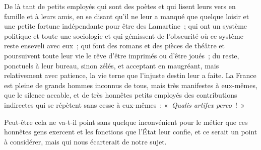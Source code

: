 \documentclass[french,twoside]{book} %
\newcommand{\astertri}{\medskip\par\centerline{\color{rubric}\large\selectfont{\syms ✻\,✻\,✻}}\medskip\par}%
\begin{document}
De là tant de petits employés qui sont des poètes et qui lisent leurs vers en famille et à leurs amis, en se disant qu’il ne leur a manqué que quelque loisir et une petite fortune indépendante pour être des Lamartine ; qui ont un système politique et toute une sociologie et qui gémissent de l’obscurité où ce système reste enseveli avec eux ; qui font des romans et des pièces de théâtre et poursuivent toute leur vie le rêve d’être imprimés ou d’être joués ; du reste, ponctuels à leur bureau, sinon zélés, et acceptant en maugréant, mais relativement avec patience, la vie terne que l’injuste destin leur a faite. La France est pleine de grands hommes inconnus de tous, mais très manifestes à eux-mêmes, que le silence accable, et de très honnêtes petits employés des contributions indirectes qui se répètent sans cesse à eux-mêmes : « {\itshape Qualis artifex pereo} ! »\par
Peut-être cela ne va-t-il point sans quelque inconvénient  pour le métier que ces honnêtes gens exercent et les fonctions que l’État leur confie, et ce serait un point à considérer, mais qui nous écarterait de notre sujet.\par

\astertri
\end{document}
